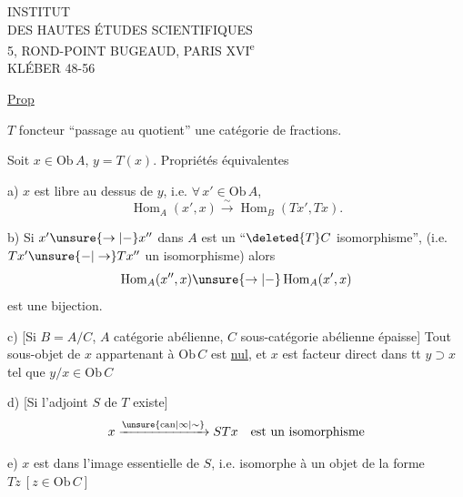 


\begin{center}
INSTITUT\\
DES HAUTES ÉTUDES SCIENTIFIQUES\\
5, ROND-POINT BUGEAUD, PARIS XVI\textsuperscript{e}\\
KLÉBER 48-56
\end{center}

\uline{Prop}


$T$ foncteur ``passage au quotient''  une catégorie de fractions.

Soit $x\in\mathrm{Ob}\,A$, $y=T(x)$. Propriétés équivalentes

a) $x$ est libre au dessus de $y$, i.e. $\forall\,x'\in\mathrm{Ob}\,A$,
\[
\operatorname{Hom}_{A}(x',x)\xrightarrow{\sim}\operatorname{Hom}_{B}(Tx',Tx).
\]

b) Si $x'\unsure{\to|-}x''$ dans $A$ est un ``$\deleted{T}C$ isomorphisme'', (i.e. $Tx'\unsure{-|\to}Tx''$ un isomorphisme) alors
\[
\operatorname{Hom}_{A}(x'',x)\unsure{\to|-}\operatorname{Hom}_{A}(x',x)
\]
est une bijection.

c) [Si $B=A/C$, $A$ catégorie abélienne, $C$ sous-catégorie abélienne épaisse] Tout sous-objet de $x$ appartenant à $\mathrm{Ob}\,C$ est \uline{nul}, et $x$ est facteur direct dans tt $y\supset x$ tel que $y/x\in\mathrm{Ob}\,C$

d) [Si l'adjoint $S$ de $T$ existe]
\[
x\xrightarrow{\unsure{\mathrm{can}|\infty|\sim}}STx\quad\text{est un isomorphisme}
\]

e)  $x$ est dans l'image essentielle de $S$, i.e. isomorphe à un objet de la forme $Tz\ [z\in\mathrm{Ob}\,C]$

